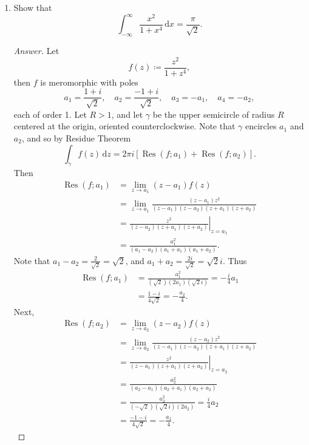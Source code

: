 \documentclass[12pt]{article}
\newcommand\paren[1]{\left( #1 \right)}
\newcommand{\sqbrack}[1]{\left [ #1 \right ]}
\theoremstyle{definition}
\DeclareMathOperator\Res{Res}
\begin{document}
\begin{enumerate}
    \item Show that 
    \[
        \int_{-\infty}^{\infty} \frac{x^2}{1+x^4} \, \mathrm{d}x = \frac{\pi}{\sqrt{2}}.
    \]
    \begin{proof}[Answer]
        Let 
        \[
            f(z) \coloneqq \frac{z^2}{1 + z^4},
        \]
        then $f$ is meromorphic with poles 
        \[
            a_1 = \frac{1 + i}{\sqrt{2}} , \quad a_2 = \frac{-1 + i}{\sqrt{2}} , \quad a_3 = -a_1 , \quad a_4 = -a_2,
        \]
        each of order 1. Let $R > 1$, and let $\gamma$ be the upper semicircle of radius $R$ centered at the origin, oriented counterclockwise. Note that $\gamma$ encircles $a_1$ and $a_2$, and so by Residue Theorem
        \[
            \int_{\gamma} f(z) \, \mathrm{d}z = 2\pi i \sqbrack{ \Res(f;a_1) + \Res(f;a_2) }.
        \]
        Then 
        \begin{align*}
            \Res(f;a_1) & = \lim\limits_{z \to a_1} (z-a_1) f(z) \\
            & = \lim\limits_{z \to a_1} \frac{(z - a_1)z^2}{(z-a_1)(z-a_2)(z+a_1)(z+a_2)} \\
            & = \left. \frac{z^2}{(z-a_2)(z+a_1)(z+a_2)} \right|_{z = a_1} \\
            & = \frac{a_1^2}{(a_1 - a_2)(a_1 + a_1)(a_1 + a_2)}.
        \end{align*}
        Note that $a_1 - a_2 = \frac{2}{\sqrt{2}} = \sqrt{2}$, and $a_1 + a_2 = \frac{2i}{\sqrt{2}} = \sqrt{2}i$. Thus 
        \begin{align*}
            \Res(f;a_1) & = \frac{ a_1^2 }{ \paren{ \sqrt{2} } \paren{ 2a_1 } \paren{ \sqrt{2}i } } = -\frac{i}{4}a_1 \\
            & = \frac{1 - i}{4\sqrt{2}} = -\frac{a_2}{4}.
        \end{align*}
        Next,
        \begin{align*}
            \Res(f;a_2) & = \lim\limits_{z \to a_2} (z-a_2) f(z) \\
            & = \lim\limits_{z \to a_2} \frac{(z - a_2)z^2}{(z-a_1)(z-a_2)(z+a_1)(z+a_2)} \\
            & = \left. \frac{z^2}{(z-a_1)(z+a_1)(z+a_2)} \right|_{z = a_2} \\
            & = \frac{a_2^2}{(a_2-a_1)(a_2+a_1)(a_2+a_2)} \\
            & = \frac{a_2^2}{(-\sqrt{2})(\sqrt{2}i)(2a_2)} = \frac{i}{4}a_2 \\
            & = \frac{-1 - i}{4\sqrt{2}} = -\frac{a_1}{4}.

\end{align*}
\end{proof}
\end{enumerate}
\end{document}
